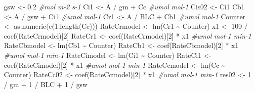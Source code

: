\documentclass[
]{krantz}
\makeatletter
\newenvironment{Shaded}{\begin{snugshade}}{\end{snugshade}}
\newcommand{\CommentTok}[1]{\textcolor[rgb]{0.56,0.35,0.01}{\textit{#1}}}
\newcommand{\DecValTok}[1]{\textcolor[rgb]{0.00,0.00,0.81}{#1}}
\newcommand{\FloatTok}[1]{\textcolor[rgb]{0.00,0.00,0.81}{#1}}
\newcommand{\FunctionTok}[1]{\textcolor[rgb]{0.00,0.00,0.00}{#1}}
\newcommand{\NormalTok}[1]{#1}
\newcommand{\OtherTok}[1]{\textcolor[rgb]{0.56,0.35,0.01}{#1}}
\newcommand{\SpecialCharTok}[1]{\textcolor[rgb]{0.00,0.00,0.00}{#1}}
\newenvironment{kframe}{%
\medskip{}
\setlength{\fboxsep}{.8em}
 \def\at@end@of@kframe{}%
 \ifinner\ifhmode%
  \def\at@end@of@kframe{\end{minipage}}%
  \begin{minipage}{\columnwidth}%
 \fi\fi%
 \def\FrameCommand##1{\hskip\@totalleftmargin \hskip-\fboxsep
 \colorbox{shadecolor}{##1}\hskip-\fboxsep
     \hskip-\linewidth \hskip-\@totalleftmargin \hskip\columnwidth}%
 \MakeFramed {\advance\hsize-\width
   \@totalleftmargin\z@ \linewidth\hsize
   \@setminipage}}%
 {\par\unskip\endMakeFramed%
 \at@end@of@kframe}
\renewenvironment{Shaded}{\begin{kframe}}{\end{kframe}}
\makeatother
\begin{document}
\begin{Shaded}
\begin{Highlighting}[]
\NormalTok{gsw }\OtherTok{\textless{}{-}} \FloatTok{0.2} \CommentTok{\#mol m{-}2 s{-}1}
\NormalTok{Ci1 }\OtherTok{\textless{}{-}}\NormalTok{ A }\SpecialCharTok{/}\NormalTok{ gm }\SpecialCharTok{+}\NormalTok{ Cc }\CommentTok{\#umol mol{-}1}
\NormalTok{Cis02 }\OtherTok{\textless{}{-}}\NormalTok{ Ci1}
\NormalTok{Cb1 }\OtherTok{\textless{}{-}}\NormalTok{ A }\SpecialCharTok{/}\NormalTok{ gsw }\SpecialCharTok{+}\NormalTok{ Ci1 }\CommentTok{\#umol mol{-}1}
\NormalTok{Cr1 }\OtherTok{\textless{}{-}}\NormalTok{ A }\SpecialCharTok{/}\NormalTok{ BLC }\SpecialCharTok{+}\NormalTok{ Cb1 }\CommentTok{\#umol mol{-}1}
\NormalTok{Counter }\OtherTok{\textless{}{-}} \FunctionTok{as.numeric}\NormalTok{(}\FunctionTok{c}\NormalTok{(}\DecValTok{1}\SpecialCharTok{:}\FunctionTok{length}\NormalTok{(Cc)))}
\NormalTok{RateCrmodel }\OtherTok{\textless{}{-}} \FunctionTok{lm}\NormalTok{(Cr1 }\SpecialCharTok{\textasciitilde{}}\NormalTok{ Counter)}
\NormalTok{x1 }\OtherTok{\textless{}{-}} \DecValTok{100} \SpecialCharTok{/} \FunctionTok{coef}\NormalTok{(RateCrmodel)[}\DecValTok{2}\NormalTok{]}
\NormalTok{RateCr1 }\OtherTok{\textless{}{-}} \FunctionTok{coef}\NormalTok{(RateCrmodel)[}\DecValTok{2}\NormalTok{] }\SpecialCharTok{*}\NormalTok{ x1 }\CommentTok{\#umol mol{-}1 min{-}1}
\NormalTok{RateCbmodel }\OtherTok{\textless{}{-}} \FunctionTok{lm}\NormalTok{(Cb1 }\SpecialCharTok{\textasciitilde{}}\NormalTok{ Counter)}
\NormalTok{RateCb1 }\OtherTok{\textless{}{-}} \FunctionTok{coef}\NormalTok{(RateCbmodel)[}\DecValTok{2}\NormalTok{] }\SpecialCharTok{*}\NormalTok{ x1 }\CommentTok{\#umol mol{-}1 min{-}1}
\NormalTok{RateCimodel }\OtherTok{\textless{}{-}} \FunctionTok{lm}\NormalTok{(Ci1 }\SpecialCharTok{\textasciitilde{}}\NormalTok{ Counter)}
\NormalTok{RateCi1 }\OtherTok{\textless{}{-}} \FunctionTok{coef}\NormalTok{(RateCimodel)[}\DecValTok{2}\NormalTok{] }\SpecialCharTok{*}\NormalTok{ x1 }\CommentTok{\#umol mol{-}1 min{-}1}
\NormalTok{RateCcmodel }\OtherTok{\textless{}{-}} \FunctionTok{lm}\NormalTok{(Cc }\SpecialCharTok{\textasciitilde{}}\NormalTok{ Counter)}
\NormalTok{RateCc02 }\OtherTok{\textless{}{-}} \FunctionTok{coef}\NormalTok{(RateCcmodel)[}\DecValTok{2}\NormalTok{] }\SpecialCharTok{*}\NormalTok{ x1 }\CommentTok{\#umol mol{-}1 min{-}1}
\NormalTok{res02 }\OtherTok{\textless{}{-}} \DecValTok{1} \SpecialCharTok{/}\NormalTok{ gm }\SpecialCharTok{+} \DecValTok{1} \SpecialCharTok{/}\NormalTok{ BLC }\SpecialCharTok{+} \DecValTok{1} \SpecialCharTok{/}\NormalTok{ gsw}


\end{Highlighting}
\end{Shaded}
\end{document}
